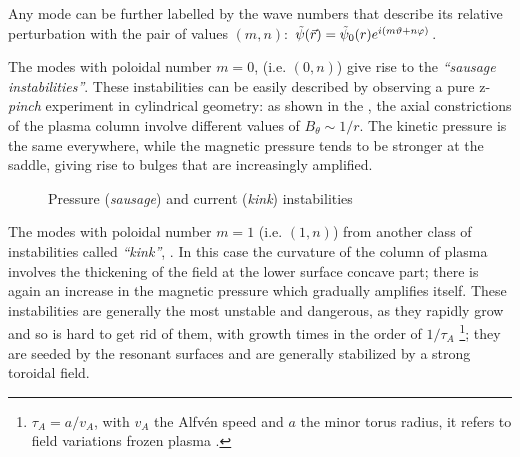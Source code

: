 Any mode can be further labelled by the wave numbers that describe its relative perturbation
with the pair of values $(m, n)$:
$\tilde{\psi}(\Vec{r}) =
\Tilde{\psi}_0(r)e^{i(m\vartheta+n\varphi)}$.

The modes with poloidal number $m = 0$, (i.e. $(0,n)$) give rise to the \emph{``sausage instabilities''}. These instabilities can be easily described by observing a pure z-\textit{pinch} experiment in cylindrical geometry: as shown in the \Figure{\ref{fig:press-curr1}}, the axial constrictions of the plasma column involve different values of $B_\theta \sim 1/r$. The kinetic pressure is the same everywhere, while the magnetic pressure tends to be stronger at the saddle, giving rise to bulges that are increasingly amplified.
%
\begin{figure}[ht]
 \centering
 \caption{Pressure (\emph{sausage}) and current (\emph{kink}) instabilities}
\end{figure}

The modes with poloidal number $m = 1$ (i.e. $(1,n)$) from another class of instabilities called \emph{``kink''}, \Figure{\ref{fig:press-curr2}}. In this case the curvature of the column of plasma involves the thickening of the field at the lower surface concave part; there is again an increase in the magnetic pressure which gradually amplifies itself.
%
These instabilities are generally the most unstable and dangerous, as they rapidly grow and so is hard to get rid of them, with growth times in the order of $1/\tau_A$ \footnote{$\tau_A = a/v_A$, with $ v_A $ the Alfvén speed and $a$ the minor torus radius, it refers to field variations frozen plasma \cite{fridberg}.}; they are seeded by the resonant surfaces and are generally stabilized by a strong toroidal field.

